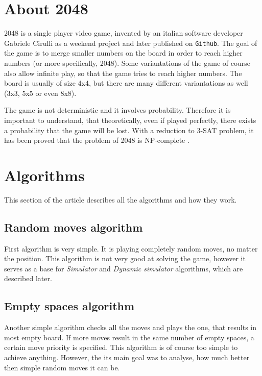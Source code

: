 \documentclass[sigconf,nonacm]{acmart}
\begin{document}
\section{About 2048}

2048 is a single player video game, invented by an italian software developer Gabriele Cirulli as a weekend project and later published on \texttt{Github}. The goal of the game is to merge smaller numbers on the board in order to reach higher numbers (or more specifically, 2048). Some variantations of the game of course also allow infinite play, so that the game tries to reach higher numbers. The board is usually of size 4x4, but there are many different variantations as well (3x3, 5x5 or even 8x8). \cite{wiki:2048_(video_game)}

The game is not deterministic and it involves probability. Therefore it is important to understand, that theoretically, even if played perfectly, there exists a probability that the game will be lost. With a reduction to 3-SAT problem, it has been proved that the problem of 2048 is NP-complete \cite{DBLP:journals/corr/AbdelkaderAD15}.

\section{Algorithms}

This section of the article describes all the algorithms and how they work.

\subsection{Random moves algorithm}

First algorithm is very simple. It is playing completely random moves, no matter the position. This algorithm is not very good at solving the game, however it serves as a base for \textit{Simulator} and \textit{Dynamic simulator} algorithms, which are described later.

\subsection{Empty spaces algorithm}

Another simple algorithm checks all the moves and plays the one, that results in most empty board. If more moves result in the same number of empty spaces, a certain move priority is specified. This algorithm is of course too simple to achieve anything. However, the its main goal was to analyse, how much better then simple random moves it can be. 
\end{document}
